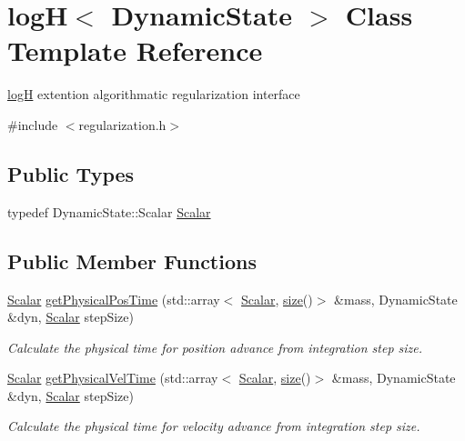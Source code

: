 \hypertarget{classlog_h}{}\section{logH$<$ Dynamic\+State $>$ Class Template Reference}
\label{classlog_h}


\mbox{\hyperlink{classlog_h}{logH}} extention algorithmatic regularization interface  




{\ttfamily \#include $<$regularization.\+h$>$}

\subsection*{Public Types}
\begin{DoxyCompactItemize}
\item 
typedef Dynamic\+State\+::\+Scalar \mbox{\hyperlink{classlog_h_a3c5a69c2908971aa6cd8ff82845418d0}{Scalar}}
\end{DoxyCompactItemize}
\subsection*{Public Member Functions}
\begin{DoxyCompactItemize}
\item 
\mbox{\hyperlink{classlog_h_a3c5a69c2908971aa6cd8ff82845418d0}{Scalar}} \mbox{\hyperlink{classlog_h_a57fa85fad38dae198ec4eadd757d4f40}{get\+Physical\+Pos\+Time}} (std\+::array$<$ \mbox{\hyperlink{classlog_h_a3c5a69c2908971aa6cd8ff82845418d0}{Scalar}}, \mbox{\hyperlink{classlog_h_a94f9577ea2cc32d422ebf078e123480b}{size}}()$>$ \&mass, Dynamic\+State \&dyn, \mbox{\hyperlink{classlog_h_a3c5a69c2908971aa6cd8ff82845418d0}{Scalar}} step\+Size)
\begin{DoxyCompactList}\small\item\em Calculate the physical time for position advance from integration step size. \end{DoxyCompactList}\item 
\mbox{\hyperlink{classlog_h_a3c5a69c2908971aa6cd8ff82845418d0}{Scalar}} \mbox{\hyperlink{classlog_h_a4e287cd21c48b51fa9535c5b692ca3f2}{get\+Physical\+Vel\+Time}} (std\+::array$<$ \mbox{\hyperlink{classlog_h_a3c5a69c2908971aa6cd8ff82845418d0}{Scalar}}, \mbox{\hyperlink{classlog_h_a94f9577ea2cc32d422ebf078e123480b}{size}}()$>$ \&mass, Dynamic\+State \&dyn, \mbox{\hyperlink{classlog_h_a3c5a69c2908971aa6cd8ff82845418d0}{Scalar}} step\+Size)
\begin{DoxyCompactList}\small\item\em Calculate the physical time for velocity advance from integration step size. \end{DoxyCompactList}\end{DoxyCompactItemize}
